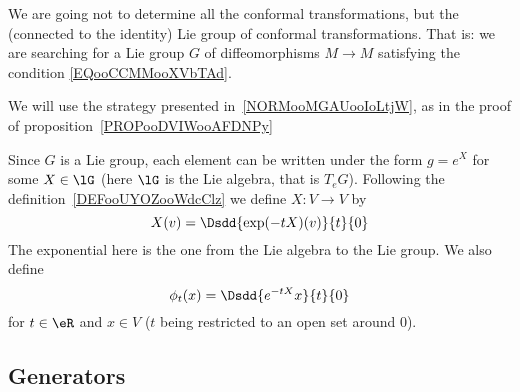 \begin{remark}
    We are going not to determine all the conformal transformations, but the (connected to the identity) Lie group of conformal transformations. That is: we are searching for a Lie group \( G\) of diffeomorphisms \( M\to M\) satisfying the condition \eqref{EQooCCMMooXVbTAd}.
\end{remark}

We will use the strategy presented in~\ref{NORMooMGAUooIoLtjW}, as in the proof of proposition~\ref{PROPooDVIWooAFDNPy}

Since \( G\) is a Lie group, each element can be written under the form \( g= e^{X}\) for some \( X\in\lG\) (here \( \lG\) is the Lie algebra, that is \( T_eG\)). Following the definition~\ref{DEFooUYOZooWdcClz} we define \( X\colon V\to V\) by
\begin{equation}
    X(v)=\Dsdd{  \exp(-tX)(v) }{t}{0}
\end{equation}
The exponential here is the one from the Lie algebra to the Lie group. We also define
\begin{equation}
    \phi_t(x)=\Dsdd{  e^{-tX}x }{t}{0}
\end{equation}
for \( t\in \eR\) and \( x\in V\) (\( t\) being restricted to an open set around \( 0\)).

\subsection{Generators}

